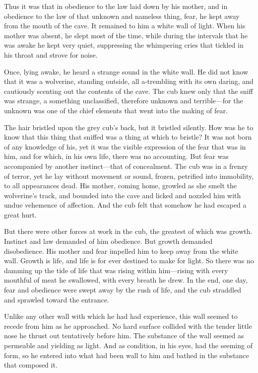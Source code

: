 \documentclass[10pt]{book}
\begin{document}
Thus it was that in obedience to the law laid down by his mother, and
in obedience to the law of that unknown and nameless thing, fear, he
kept away from the mouth of the cave. It remained to him a white wall
of light. When his mother was absent, he slept most of the time, while
during the intervals that he was awake he kept very quiet, suppressing
the whimpering cries that tickled in his throat and strove for noise.

Once, lying awake, he heard a strange sound in the white wall. He did
not know that it was a wolverine, standing outside, all a-trembling
with its own daring, and cautiously scenting out the contents of the
cave. The cub knew only that the sniff was strange, a something
unclassified, therefore unknown and terrible—for the unknown was one of
the chief elements that went into the making of fear.

The hair bristled upon the grey cub’s back, but it bristled silently.
How was he to know that this thing that sniffed was a thing at which to
bristle? It was not born of any knowledge of his, yet it was the
visible expression of the fear that was in him, and for which, in his
own life, there was no accounting. But fear was accompanied by another
instinct—that of concealment. The cub was in a frenzy of terror, yet he
lay without movement or sound, frozen, petrified into immobility, to
all appearances dead. His mother, coming home, growled as she smelt the
wolverine’s track, and bounded into the cave and licked and nozzled him
with undue vehemence of affection. And the cub felt that somehow he had
escaped a great hurt.

But there were other forces at work in the cub, the greatest of which
was growth. Instinct and law demanded of him obedience. But growth
demanded disobedience. His mother and fear impelled him to keep away
from the white wall. Growth is life, and life is for ever destined to
make for light. So there was no damming up the tide of life that was
rising within him—rising with every mouthful of meat he swallowed, with
every breath he drew. In the end, one day, fear and obedience were
swept away by the rush of life, and the cub straddled and sprawled
toward the entrance.

Unlike any other wall with which he had had experience, this wall
seemed to recede from him as he approached. No hard surface collided
with the tender little nose he thrust out tentatively before him. The
substance of the wall seemed as permeable and yielding as light. And as
condition, in his eyes, had the seeming of form, so he entered into
what had been wall to him and bathed in the substance that composed it.
\end{document}
